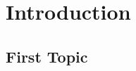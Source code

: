 \documentclass[a4paper, 11pt]{report}
\begin{document}
\makecustomcover

\tableofcontents
\clearpage

\chapter{Introduction}

\section{First Topic}
\end{document}
